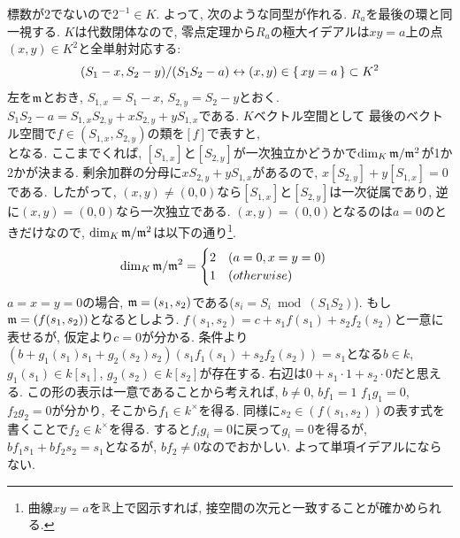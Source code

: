 \begin{egans}
標数が2でないので$2^{-1}\in K$. よって, 次のような同型が作れる.
$R_a$を最後の環と同一視する. $K$は代数閉体なので, 零点定理から$R_a$の極大イデアルは$xy = a$上の点$(x,y)\in K^2$と全単射対応する:
\[ (S_1-x, S_2-y)/(S_1S_2-a) \leftrightarrow (x,y)\in \set{xy=a}\subset K^2 \]
左を$\mathfrak{m}$とおき, $S_{1,x} = S_1-x$, $S_{2,y} = S_2-y$とおく. $S_1S_2 - a = S_{1,x}S_{2,y} + xS_{2,y} + yS_{1,x}$である. $K$ベクトル空間として
最後のベクトル空間で$f\in (S_{1,x},S_{2,y})$の類を$[f]$で表すと,
\\
となる. ここまでくれば, $[S_{1,x}]$と$[S_{2,y}]$が一次独立かどうかで$\dim_{K}\mathfrak{m}/\mathfrak{m}^2$が1か2かが決まる. 剰余加群の分母に$xS_{2,y} + yS_{1,x}$があるので, $x[S_{2,y}] + y[S_{1,x}] = 0$である. したがって, $(x,y)\neq (0,0)$なら$[S_{1,x}]$と$[S_{2,y}]$は一次従属であり, 逆に$(x,y)=(0,0)$なら一次独立である. $(x,y) = (0,0)$となるのは$a=0$のときだけなので, $\dim_{K}\mathfrak{m}/\mathfrak{m}^2$は以下の通り\footnote{曲線$xy=a$を$\mathbb{R}$上で図示すれば, 接空間の次元と一致することが確かめられる. }.
\[
\dim_{K}\mathfrak{m}/\mathfrak{m}^2 =
\begin{cases}
2\quad (a=0, x=y=0)\\
1\quad (otherwise)
\end{cases}
\]
$a=x=y=0$の場合, $\mathfrak{m} = (s_1,s_2)$である($s_i = S_i \bmod{(S_1S_2)}$). もし$\mathfrak{m} = (f(s_1,s_2))$となるとしよう. $f(s_1,s_2) = c + s_1f(s_1) + s_2f_2(s_2)$と一意に表せるが, 仮定より$c=0$が分かる. 条件より$(b + g_1(s_1)s_1 + g_2(s_2)s_2)(s_1f_1(s_1) + s_2f_2(s_2)) = s_1$となる$b\in k$, $g_1(s_1)\in k[s_1]$, $g_2(s_2)\in k[s_2]$が存在する. 右辺は$0+s_1\cdot 1 + s_2\cdot 0$だと思える. この形の表示は一意であることから考えれば, $b\neq 0$, $bf_1 = 1$ $f_1g_1 = 0$, $f_2g_2 = 0$が分かり, そこから$f_1\in k^{\times}$を得る. 同様に$s_2\in (f(s_1,s_2))$の表す式を書くことで$f_2\in k^{\times}$を得る. すると$f_ig_i = 0$に戻って$g_i = 0$を得るが, $bf_1 s_1 + bf_2s_2 = s_1$となるが, $bf_2 \neq 0$なのでおかしい. よって単項イデアルにならない. \par

\end{egans}
